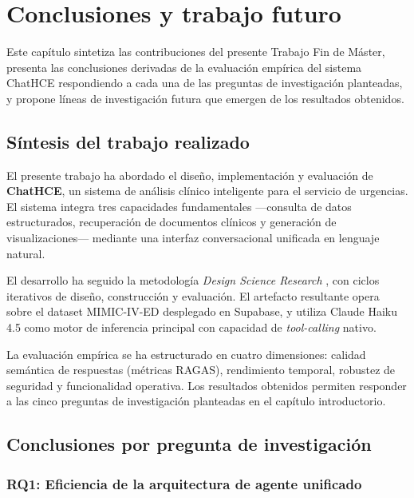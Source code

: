 
\chapter{Conclusiones y trabajo futuro}
\label{cap:conclusiones}

Este capítulo sintetiza las contribuciones del presente Trabajo Fin de Máster, presenta las conclusiones derivadas de la evaluación empírica del sistema ChatHCE respondiendo a cada una de las preguntas de investigación planteadas, y propone líneas de investigación futura que emergen de los resultados obtenidos.

\section{Síntesis del trabajo realizado}
\label{sec:sintesis}

El presente trabajo ha abordado el diseño, implementación y evaluación de \textbf{ChatHCE}, un sistema de análisis clínico inteligente para el servicio de urgencias. El sistema integra tres capacidades fundamentales ---consulta de datos estructurados, recuperación de documentos clínicos y generación de visualizaciones--- mediante una interfaz conversacional unificada en lenguaje natural.

El desarrollo ha seguido la metodología \textit{Design Science Research} \parencite{Hevner2004,Peffers2007dsrm}, con ciclos iterativos de diseño, construcción y evaluación. El artefacto resultante opera sobre el dataset \acs{MIMIC}-IV-\acs{ED} \parencite{johnson2023mimiciv} desplegado en Supabase, y utiliza Claude Haiku 4.5 como motor de inferencia principal con capacidad de \textit{tool-calling} nativo.

La evaluación empírica se ha estructurado en cuatro dimensiones: calidad semántica de respuestas (métricas \ac{RAGAS}), rendimiento temporal, robustez de seguridad y funcionalidad operativa. Los resultados obtenidos permiten responder a las cinco preguntas de investigación planteadas en el capítulo introductorio.

\section{Conclusiones por pregunta de investigación}
\label{sec:conclusiones_rq}

\subsection{RQ1: Eficiencia de la arquitectura de agente unificado}

